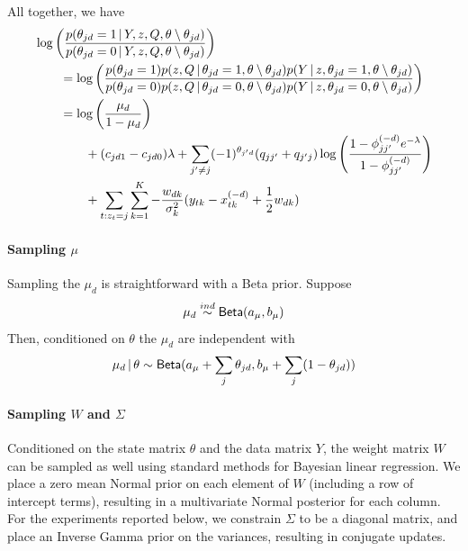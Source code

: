 All together, we have
\begin{align}
  \label{eq:77}
  &\log\left(\frac{p(\theta_{jd} = 1 \, \vert \, Y, z, Q, \theta \setminus
    \theta_{jd})}{p(\theta_{jd} = 0 \, \vert \, Y, z, Q, \theta
    \setminus \theta_{jd})}\right) \\ &\qquad = \log\left(\frac{p(\theta_{jd} =
  1) p(z, Q \, \vert \, \theta_{jd} = 1, \theta \setminus
  \theta_{jd}) p(Y \, \vert \, z, \theta_{jd} = 1, \theta \setminus \theta_{jd})}{p(\theta_{jd} = 0) p(z, Q \, \vert \, \theta_{jd} = 0,
  \theta \setminus \theta_{jd}) p(Y \, \vert \, z, \theta_{jd} = 0,
  \theta \setminus \theta_{jd})}\right) \\ & \qquad = \log\left(\frac{\mu_d}{1 - \mu_d}\right)
  \\ & \qquad \qquad + (c_{jd1} - c_{jd0}) \lambda +
    \sum_{j' \neq j}
  (-1)^{\theta_{j'd}}(q_{jj'} + q_{j'j})\log\left(\frac{1 -
      \phi_{jj'}^{(-d)}e^{-\lambda}}{1-\phi_{jj'}^{(-d)}}\right) \\ &
  \qquad \qquad + \sum_{t: z_t = j} \sum_{k=1}^K -\frac{w_{dk}}{\sigma^2_k}(y_{tk} - x_{tk}^{(-d)} + \frac{1}{2}w_{dk})
\end{align}

\paragraph{Sampling $\mu$}
\label{sec:sampling-bmu}

Sampling the $\mu_d$ is straightforward with a Beta prior.  Suppose
\begin{equation}
  \label{eq:92}
  \mu_d \stackrel{ind}{\sim} \mathsf{Beta}(a_\mu,b_\mu)
\end{equation}
Then, conditioned on $\theta$ the $\mu_d$ are independent with
\begin{equation}
  \label{eq:93}
  \mu_d \, \vert \, \theta \sim \mathsf{Beta}(a_\mu + \sum_{j} \theta_{jd},b_\mu +
  \sum_{j} (1 - \theta_{jd}))
\end{equation}

\paragraph{Sampling $W$ and $\Sigma$}
Conditioned on the state matrix $\theta$ and the data matrix $Y$, 
the weight matrix $W$ can be sampled as well using standard methods
for Bayesian linear regression.  We place a zero mean Normal prior on each
element of $W$ (including a row of intercept terms), resulting in a
multivariate Normal posterior for each column.  For the experiments
reported below, we constrain $\Sigma$ to be a diagonal matrix, and
place an Inverse Gamma prior on the variances, resulting in conjugate updates.

